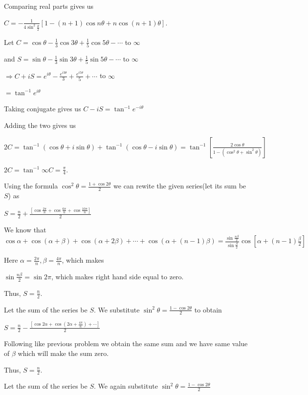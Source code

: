   Comparing real parts gives us

  $C = -\frac{1}{4\sin^2\frac{\theta}{2}}\left[1 - (n + 1)\cos n\theta + n\cos(n + 1)\theta\right]$.
\item Let $C = \cos\theta - \frac{1}{3}\cos3\theta + \frac{1}{5}\cos5\theta - \cdots$ to
  $\infty$

  and $S = \sin\theta - \frac{1}{3}\sin3\theta + \frac{1}{5}\sin5\theta - \cdots$ to
  $\infty$

  $\Rightarrow C + iS = e^{i\theta} - \frac{e^{i3\theta}}{3} + \frac{e^{i5\theta}}{5} + \cdots$ to $\infty$

  $= \tan^{-1}e^{i\theta}$

  Taking conjugate gives us $C - iS = \tan^{-1}e^{-i\theta}$

  Adding the two gives us

  $2C = \tan^{-1}(\cos\theta + i\sin\theta) + \tan^{-1}(\cos\theta - i\sin\theta) =
  \tan^{-1}\left[\frac{2\cos\theta}{1 - \left(\cos^2\theta + \sin^2\theta\right)}\right]$

  $2C = \tan^{-1}\infty C = \frac{\pi}{4}$.
\item Using the formula $\cos^2\theta = \frac{1 + \cos2\theta}{2}$ we can rewite the given series(let its
  sum be $S$) as

  $S = \frac{n}{2} + \frac{\left[\cos\frac{2\pi}{n} + \cos\frac{6\pi}{n} + \cos\frac{10\pi}{n}\right]}{2}$

  We know that $\cos\alpha + \cos(\alpha + \beta) + \cos(\alpha + 2\beta) + \cdots + \cos(\alpha + (n -
  1)\beta) = \frac{\sin\frac{n\beta}{2}}{\sin\frac{\beta}{2}}\cos\left[\alpha + (n -
    1)\frac{\beta}{2}\right]$

  Here $\alpha = \frac{2\pi}{n}, \beta = \frac{4\pi}{n}$, which makes

  $\sin\frac{n\beta}{2} = \sin2\pi$, which makes right hand side equal to zero.

  Thus, $S = \frac{n}{2}$.
\item Let the sum of the series be $S$. We substitute $\sin^2\theta = \frac{1 - \cos2\theta}{2}$ to obtain

  $S = \frac{n}{2} - \frac{\left[\cos2\alpha + \cos\left(2\alpha + \frac{4\pi}{n}\right) + \cdots\right]}{2}$

  Following like previous problem we obtain the same sum and we have same value of $\beta$ which will make
  the sum zero.

  Thus, $S = \frac{n}{2}$.
\item Let the sum of the series be $S$. We again substitute $\sin^2\theta = \frac{1 - \cos2\theta}{2}$

